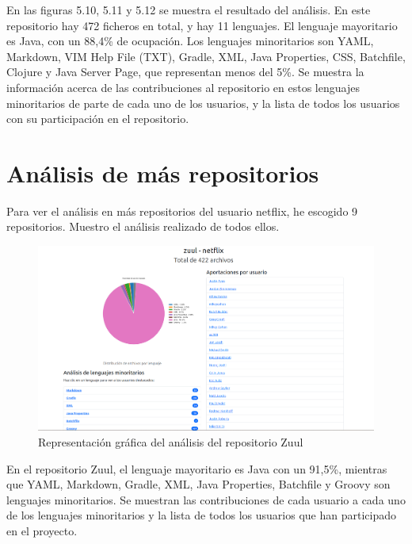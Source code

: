 \documentclass[a4paper, 12pt]{book}
\begin{document}
En las figuras 5.10, 5.11 y 5.12 se muestra el resultado del análisis. En este repositorio hay 472 ficheros en total, y hay 11 lenguajes. El lenguaje mayoritario es Java, con un 88,4\% de ocupación. Los lenguajes minoritarios son YAML, Markdown, VIM Help File (TXT), Gradle, XML, Java Properties, CSS, Batchfile, Clojure y Java Server Page, que representan menos del 5\%. Se muestra la información acerca de las contribuciones al repositorio en estos lenguajes minoritarios de parte de  cada uno de los usuarios, y la lista de todos los usuarios con su participación en el repositorio.

\section{Análisis de más repositorios}
\label{sec:Análisis de más repositorios}

Para ver el análisis en más repositorios del usuario netflix, he escogido 9 repositorios. Muestro el análisis realizado de todos ellos.

\begin{figure}[H]
  \centering
  \includegraphics[width=1\textwidth]{img/zuul.png}
  \caption{Representación gráfica del análisis del repositorio Zuul}
  \label{figura:analisiszuul}
\end{figure}

En el repositorio Zuul, el lenguaje mayoritario es Java con un 91,5\%, mientras que YAML, Markdown, Gradle, XML, Java Properties, Batchfile y Groovy son lenguajes minoritarios. Se muestran las contribuciones de cada usuario a cada uno de los lenguajes minoritarios y la lista de todos los usuarios que han participado en el proyecto.
\end{document}
